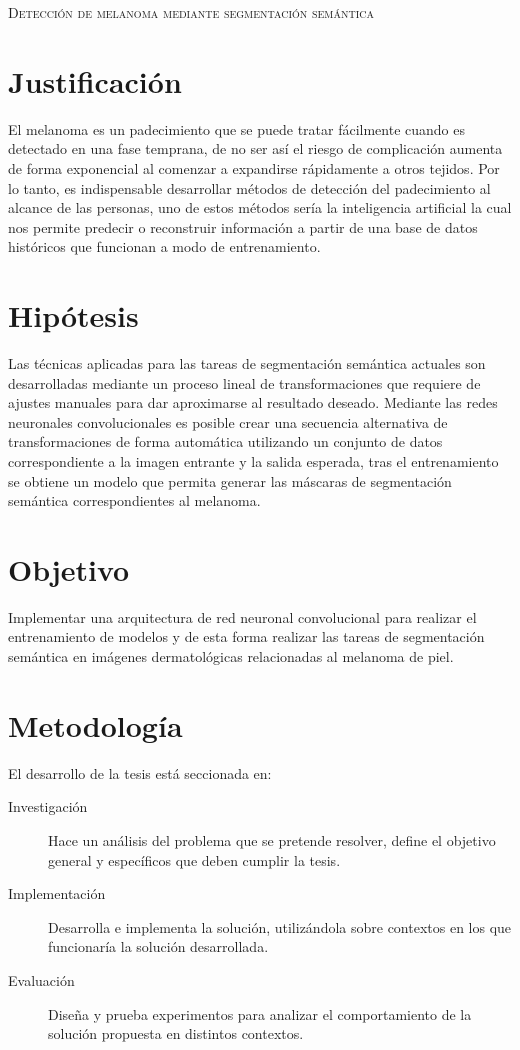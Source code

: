 \documentclass{article}
\begin{document}
\begin{center} {\scshape\LARGE Detección de melanoma mediante segmentación semántica \par} \end{center}


\section*{Justificación}
El melanoma es un padecimiento que se puede tratar fácilmente cuando es detectado en una fase temprana, de no ser así el riesgo de complicación aumenta de forma exponencial al comenzar a expandirse rápidamente a otros tejidos. Por lo tanto, es indispensable desarrollar métodos de detección del padecimiento al alcance de las personas, uno de estos métodos sería la inteligencia artificial la cual nos permite predecir o reconstruir información a partir de una base de datos históricos que funcionan a modo de entrenamiento.

\section*{Hipótesis}
Las técnicas aplicadas para las tareas de segmentación semántica actuales son desarrolladas mediante un proceso lineal de transformaciones que requiere de ajustes manuales para dar aproximarse al resultado deseado. Mediante las redes neuronales convolucionales es posible crear una secuencia alternativa de transformaciones de forma automática utilizando un conjunto de datos correspondiente a la imagen entrante y la salida esperada, tras el entrenamiento se obtiene un modelo que permita generar las máscaras de segmentación semántica correspondientes al melanoma.

\section*{Objetivo}
Implementar una arquitectura de red neuronal convolucional para realizar el entrenamiento de modelos y de esta forma realizar las tareas de segmentación semántica en imágenes dermatológicas relacionadas al melanoma de piel.

\section*{Metodología}
El desarrollo de la tesis está seccionada en:

\begin{description}
\item[Investigación]{Hace un análisis del problema que se pretende resolver, define el objetivo general y específicos que deben cumplir la tesis.}

\item[Implementación]{Desarrolla e implementa la solución, utilizándola sobre contextos en los que funcionaría la solución desarrollada. }

\item[Evaluación]{Diseña y prueba experimentos para analizar el comportamiento de la solución propuesta en distintos contextos.}

\end{description}
\end{document}
